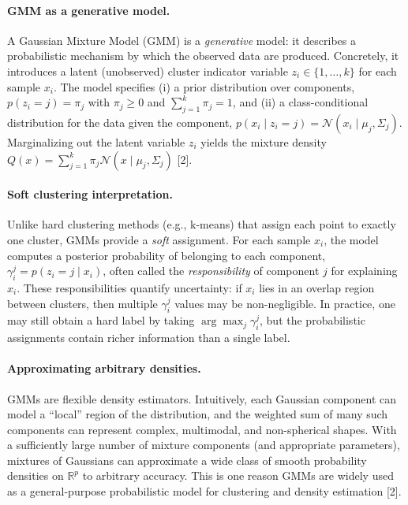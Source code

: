 \documentclass{article}
\renewcommand{\cite}[1]{[#1]}
\begin{document}
\paragraph{GMM as a generative model.}
A Gaussian Mixture Model (GMM) is a \emph{generative} model: it describes a probabilistic mechanism by which the observed data are produced. Concretely, it introduces a latent (unobserved) cluster indicator variable $z_i \in \{1,\dots,k\}$ for each sample $x_i$. The model specifies (i) a prior distribution over components, $p(z_i=j)=\pi_j$ with $\pi_j \ge 0$ and $\sum_{j=1}^k \pi_j = 1$, and (ii) a class-conditional distribution for the data given the component, $p(x_i \mid z_i=j)=\mathcal{N}(x_i \mid \mu_j, \Sigma_j)$. Marginalizing out the latent variable $z_i$ yields the mixture density $Q(x)=\sum_{j=1}^k \pi_j \mathcal{N}(x \mid \mu_j, \Sigma_j)$ \cite{2}.

\paragraph{Soft clustering interpretation.}
Unlike hard clustering methods (e.g., k-means) that assign each point to exactly one cluster, GMMs provide a \emph{soft} assignment. For each sample $x_i$, the model computes a posterior probability of belonging to each component,
$\gamma_i^j = p(z_i=j \mid x_i)$, often called the \emph{responsibility} of component $j$ for explaining $x_i$. These responsibilities quantify uncertainty: if $x_i$ lies in an overlap region between clusters, then multiple $\gamma_i^j$ values may be non-negligible. In practice, one may still obtain a hard label by taking $\arg\max_j \gamma_i^j$, but the probabilistic assignments contain richer information than a single label.

\paragraph{Approximating arbitrary densities.}
GMMs are flexible density estimators. Intuitively, each Gaussian component can model a “local” region of the distribution, and the weighted sum of many such components can represent complex, multimodal, and non-spherical shapes. With a sufficiently large number of mixture components (and appropriate parameters), mixtures of Gaussians can approximate a wide class of smooth probability densities on $\mathbb{R}^p$ to arbitrary accuracy. This is one reason GMMs are widely used as a general-purpose probabilistic model for clustering and density estimation \cite{2}.
\end{document}
